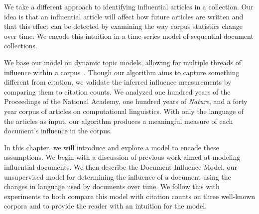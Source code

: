 We take a different approach to identifying influential articles in a
collection.  Our idea is that an influential article will affect how
future articles are written and that this effect can be detected by
examining the way corpus statistics change over time.  We encode this
intuition in a time-series model of sequential document collections.


We base our model on dynamic topic models, allowing for multiple
threads of influence within a corpus~\cite{blei:2006}. Though our
algorithm aims to capture something different from citation, we
validate the inferred influence measurements by comparing them to
citation counts.  We analyzed one hundred years of the Proceedings of
the National Academy, one hundred years of \textit{Nature}, and a
forty year corpus of articles on computational linguistics.  With only
the language of the articles as input, our algorithm produces a
meaningful measure of each document's influence in the corpus.

In this chapter, we will introduce and explore a model to encode these
assumptions.  We begin with a discussion of previous work aimed at
modeling influential documents.  We then describe the Document
Influence Model, our unsupervised model for determining the influence
of a document using the changes in language used by documents over
time.  We follow this with experiments to both compare this model with
citation counts on three well-known corpora and to provide the reader
with an intuition for the model.
